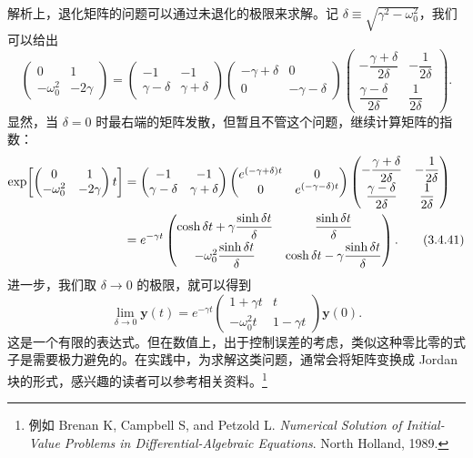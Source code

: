 解析上，退化矩阵的问题可以通过未退化的极限来求解。记 $\delta\equiv\sqrt{\gamma^2-\omega_0^2}$，我们可以给出
\begin{equation}
\begin{pmatrix}0&1\\-\omega_0^2&-2\gamma\end{pmatrix}
=\begin{pmatrix}-1&-1\\\gamma-\delta&\gamma+\delta\end{pmatrix}
\begin{pmatrix}-\gamma+\delta&0\\0&-\gamma-\delta\end{pmatrix}
\begin{pmatrix}-\dfrac{\gamma+\delta}{2\delta}&-\dfrac{1}{2\delta}\\[4pt]\dfrac{\gamma-\delta}{2\delta}&\dfrac{1}{2\delta}\end{pmatrix}.
\tag{3.4.40}
\end{equation}
显然，当 $\delta=0$ 时最右端的矩阵发散，但暂且不管这个问题，继续计算矩阵的指数：
\begin{align}
\exp\!\left[\begin{pmatrix}0&1\\-\omega_0^2&-2\gamma\end{pmatrix}t\right]
&=\begin{pmatrix}-1&-1\\\gamma-\delta&\gamma+\delta\end{pmatrix}
\begin{pmatrix}e^{(-\gamma+\delta)t}&0\\0&e^{(-\gamma-\delta)t}\end{pmatrix}
\begin{pmatrix}-\dfrac{\gamma+\delta}{2\delta}&-\dfrac{1}{2\delta}\\[4pt]\dfrac{\gamma-\delta}{2\delta}&\dfrac{1}{2\delta}\end{pmatrix}
\notag\\
&=e^{-\gamma t}
\begin{pmatrix}
\cosh\delta t+\gamma\dfrac{\sinh\delta t}{\delta}&\dfrac{\sinh\delta t}{\delta}\\[6pt]
-\omega_0^2\dfrac{\sinh\delta t}{\delta}&\cosh\delta t-\gamma\dfrac{\sinh\delta t}{\delta}
\end{pmatrix}.
\tag{3.4.41}
\end{align}
进一步，我们取 $\delta\to0$ 的极限，就可以得到
\begin{equation}
\lim_{\delta\to0}\bm y(t)
=e^{-\gamma t}
\begin{pmatrix}1+\gamma t&t\\-\omega_0^2t&1-\gamma t\end{pmatrix}\bm y(0).
\tag{3.4.42}
\end{equation}
这是一个有限的表达式。但在数值上，出于控制误差的考虑，类似这种零比零的式子是需要极力避免的。在实践中，为求解这类问题，通常会将矩阵变换成 Jordan 块的形式，感兴趣的读者可以参考相关资料。\footnote{例如 Brenan K, Campbell S, and Petzold L. \emph{Numerical Solution of Initial-Value Problems in Differential-Algebraic Equations}. North Holland, 1989.}


